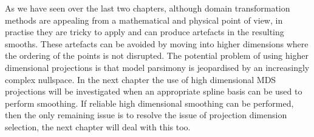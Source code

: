 As we have seen over the last two chapters, although domain transformation methods are appealing from a mathematical and physical point of view, in practise they are tricky to apply and can produce artefacts in the resulting smooths. These artefacts can be avoided by moving into higher dimensions where the ordering of the points is not disrupted. The potential problem of using higher dimensional projections is that model parsimony is jeopardised by an increasingly complex nullspace. In the next chapter the use of high dimensional MDS projections will be investigated when an appropriate spline basis can be used to perform smoothing. If reliable high dimensional smoothing can be performed, then the only remaining issue is to resolve the issue of projection dimension selection, the next chapter will deal with this too.
